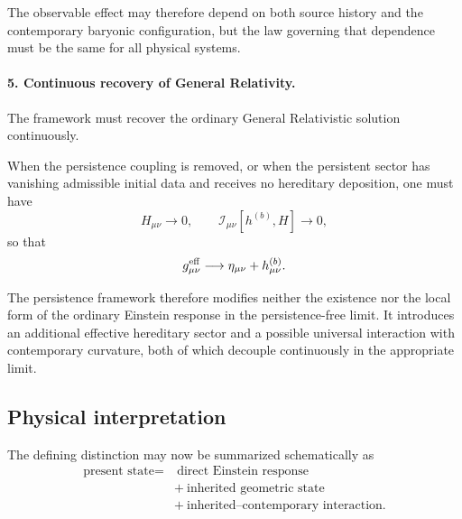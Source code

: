 The observable effect may therefore depend on both source history and the
contemporary baryonic configuration, but the law governing that dependence must
be the same for all physical systems.

\paragraph{5. Continuous recovery of General Relativity.}

The framework must recover the ordinary General Relativistic solution
continuously.

When the persistence coupling is removed, or when the persistent sector has
vanishing admissible initial data and receives no hereditary deposition, one
must have
\begin{equation}
    H_{\mu\nu}
    \longrightarrow
    0,
    \qquad
    \mathcal{I}_{\mu\nu}[h^{(b)},H]
    \longrightarrow
    0,
    \label{eq:persistent-state-gr-limit}
\end{equation}
so that
\begin{equation}
    g_{\mu\nu}^{\rm eff}
    \longrightarrow
    \eta_{\mu\nu}
    +
    h_{\mu\nu}^{(b)}.
    \label{eq:metric-gr-limit}
\end{equation}

The persistence framework therefore modifies neither the existence nor the
local form of the ordinary Einstein response in the persistence-free limit. It
introduces an additional effective hereditary sector and a possible universal
interaction with contemporary curvature, both of which decouple continuously
in the appropriate limit.

\subsection{Physical interpretation}
\label{subsec:persistent-state-interpretation}

The defining distinction may now be summarized schematically as
\begin{equation}
    \boxed{
    \begin{aligned}
    \text{present state}
    ={}&\ \text{direct Einstein response}
    \\
    &+\ \text{inherited geometric state}
    \\
    &+\ \text{inherited--contemporary interaction}.
    \end{aligned}
    }
    \label{eq:direct-persistent-interaction-response}
\end{equation}

